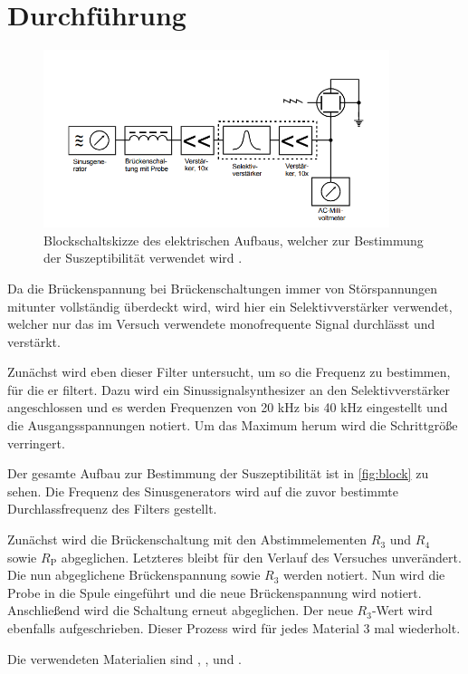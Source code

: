 \section{Durchführung}
\label{sec:Durchführung}

\begin{figure}
    \centering
    \includegraphics[width=0.90\textwidth]{content/blockschalt.png}
    \caption{Blockschaltskizze des elektrischen Aufbaus, welcher zur Bestimmung der Suszeptibilität verwendet wird \cite{V606}.}
    \label{fig:block}
\end{figure}

Da die Brückenspannung bei Brückenschaltungen immer von Störspannungen mitunter vollständig überdeckt wird,
wird hier ein Selektivverstärker verwendet, welcher nur das im Versuch verwendete monofrequente Signal durchlässt und verstärkt.

Zunächst wird eben dieser Filter untersucht, um so die Frequenz zu bestimmen, für die er filtert.
Dazu wird ein Sinussignalsynthesizer an den Selektivverstärker angeschlossen und es werden Frequenzen von 20 kHz bis 40 kHz eingestellt und die Ausgangsspannungen notiert.
Um das Maximum herum wird die Schrittgröße verringert.

Der gesamte Aufbau zur Bestimmung der Suszeptibilität ist in \autoref{fig:block} zu sehen.
Die Frequenz des Sinusgenerators wird auf die zuvor bestimmte Durchlassfrequenz des Filters gestellt.

Zunächst wird die Brückenschaltung mit den Abstimmelementen $R_3$ und $R_4$ sowie $R_\text{P}$ abgeglichen.
Letzteres bleibt für den Verlauf des Versuches unverändert.
Die nun abgeglichene Brückenspannung sowie $R_3$ werden notiert.
Nun wird die Probe in die Spule eingeführt und die neue Brückenspannung wird notiert. Anschließend wird die Schaltung erneut abgeglichen.
Der neue $R_3$-Wert wird ebenfalls aufgeschrieben.
Dieser Prozess wird für jedes Material 3 mal wiederholt.

Die verwendeten Materialien sind , ,  und .